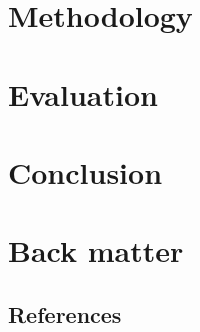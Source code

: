 \documentclass[11pt]{article}
\begin{document}
\newpage



\section{Methodology}



\section{Evaluation}


\section{Conclusion}


\appendix
\section{Back matter}
\subsection{References}
\printbibliography
\end{document}
